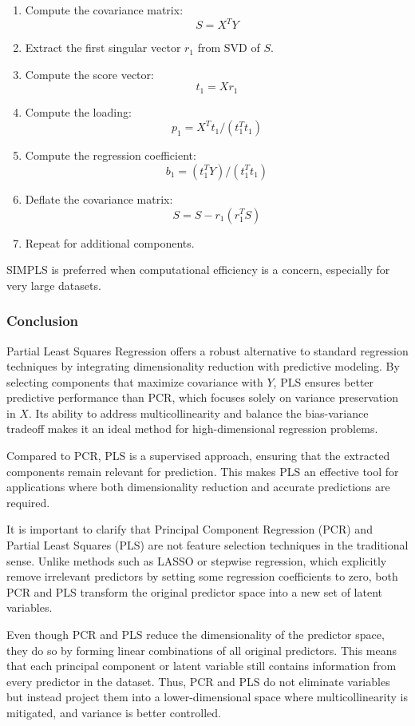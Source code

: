 \documentclass[11pt,twoside,a4paper]{article}
\begin{document}
\begin{enumerate}
    \item Compute the covariance matrix:
        \[
        S = X^T Y
        \]
    \item Extract the first singular vector \( r_1 \) from SVD of \( S \).
    \item Compute the score vector:
        \[
        t_1 = Xr_1
        \]
    \item Compute the loading:
        \[
        p_1 = X^T t_1 / (t_1^T t_1)
        \]
    \item Compute the regression coefficient:
        \[
        b_1 = (t_1^T Y) / (t_1^T t_1)
        \]
    \item Deflate the covariance matrix:
        \[
        S = S - r_1 (r_1^T S)
        \]
    \item Repeat for additional components.
\end{enumerate}

SIMPLS is preferred when computational efficiency is a concern, especially for very large datasets.


\subsubsection{Conclusion}
Partial Least Squares Regression offers a robust alternative to standard regression techniques by integrating dimensionality reduction with predictive modeling. By selecting components that maximize covariance with \( Y \), PLS ensures better predictive performance than PCR, which focuses solely on variance preservation in \( X \). Its ability to address multicollinearity and balance the bias-variance tradeoff makes it an ideal method for high-dimensional regression problems. 

Compared to PCR, PLS is a supervised approach, ensuring that the extracted components remain relevant for prediction. This makes PLS an effective tool for applications where both dimensionality reduction and accurate predictions are required.

It is important to clarify that Principal Component Regression (PCR) and Partial Least Squares (PLS) are not feature selection techniques in the traditional sense. Unlike methods such as LASSO or stepwise regression, which explicitly remove irrelevant predictors by setting some regression coefficients to zero, both PCR and PLS transform the original predictor space into a new set of latent variables.

Even though PCR and PLS reduce the dimensionality of the predictor space, they do so by forming linear combinations of all original predictors. This means that each principal component or latent variable still contains information from every predictor in the dataset. Thus, PCR and PLS do not eliminate variables but instead project them into a lower-dimensional space where multicollinearity is mitigated, and variance is better controlled.
\end{document}
